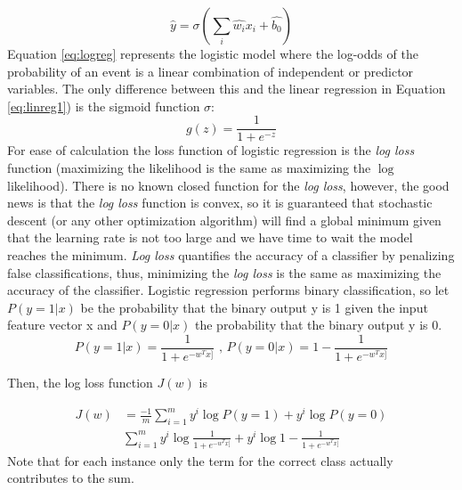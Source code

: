 \documentclass[11pt]{article}
\theoremstyle{definition}
\theoremstyle{remark}
\begin{document}
\begin{equation}
\hat{y} = \sigma(\sum_i \hat{w_i}x_i +\hat{b_0})
\label{eq:logreg}
\end{equation}
Equation \ref{eq:logreg} represents the logistic model where the log-odds of the probability of an event is a linear combination of independent or predictor variables. The only difference between this and the linear regression in Equation \ref{eq:linreg1}) is the sigmoid function $\sigma$:
\begin{equation}
g(z) = \frac{1}{1+e^{-z}}
\label{eq:sigmoid}
\end{equation}
For ease of calculation the loss function of logistic regression is the \emph{log loss} function (maximizing the likelihood is the same as maximizing the $\log$ likelihood). There is no known closed function for the \emph{log loss}, however, the good news is that the \emph{log loss} function is convex, so it is guaranteed that stochastic descent (or any other optimization algorithm) will find a global minimum given that the learning rate is not too large and we have time to wait the model reaches the minimum. \emph{Log loss} quantifies the accuracy of a classifier by penalizing false classifications, thus, minimizing the \emph{log loss} is the same as maximizing the accuracy of the classifier.
Logistic regression performs binary classification, so let $P(y=1|x)$ be the probability that the binary output y is 1 given the input feature vector x and $P(y=0|x)$ the probability that the binary output y is 0. 
\begin{equation}
P(y=1|x) = \frac{1}{1+e^{-w^{T}x]}} \textit{ , } P(y=0|x) = 1 - \frac{1}{1+e^{-w^{T}x]}}
\label{eq:sigmoid2}
\end{equation}

Then, the log loss function $J(w)$ is 

\begin{equation}
\begin{split}
J(w) &= \frac{-1}{m}\sum_{i=1}^{m} y^i\log P(y=1) + y^i \log P(y=0) \\
&  \sum_{i=1}^{m} y^i \log	\frac{1}{1+e^{-w^{T}x]}} + y^i \log 1 - \frac{1}{1+e^{-w^{T}x]}}
\end{split}
\label{eq:sigmoid3}
\end{equation}
Note that for each instance only the term for the correct class actually contributes to the sum.
\end{document}
